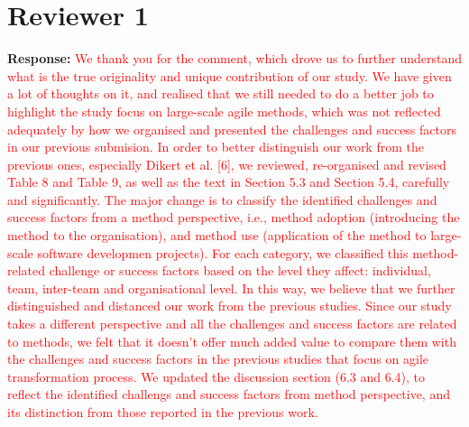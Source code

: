 \documentclass[a4paper,twoside,11pt]{reviewresponse}
\begin{document}
\clearpage

\section{Reviewer 1}
\textbf{Response:}
\textcolor{red}{We thank you for the comment, which drove us to further understand what is the true originality and unique contribution of our study. We have given a lot of thoughts on it, and realised that we still needed to do a better job to highlight the study focus on large-scale agile methods, which was not reflected adequately by how we organised and presented the challenges and success factors in our previous submision. In order to better distinguish our work from the previous ones, especially Dikert et al. [6], we reviewed, re-organised and revised Table 8 and Table 9, as well as the text in Section 5.3 and Section 5.4, carefully and significantly. The major change is to classify the identified challenges and success factors from a method perspective, i.e., method adoption (introducing the method to the organisation), and method use (application of the method to large-scale software developmen projects). For each category, we classified this method-related challenge or success factors based on the level they affect: individual, team, inter-team and organisational level. In this way, we believe that we further distinguished and distanced our work from the previous studies. Since our study takes a different perspective and all the challenges and success factors are related to methods, we felt that it doesn’t offer much added value to compare them with the challenges and success factors in the previous studies that focus on agile transformation process.
We updated the discussion section (6.3 and 6.4), to reflect the identified challengs and success factors from method perspective, and its distinction from those reported in the previous work.}
\end{document}
